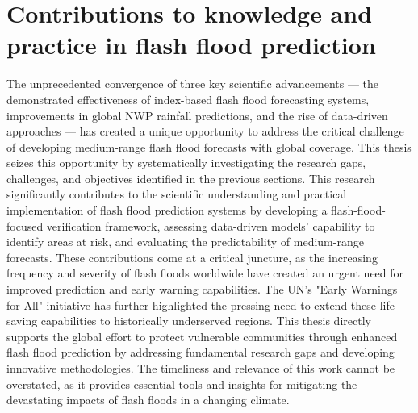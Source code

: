 \section{Contributions to knowledge and practice in flash flood prediction}


The unprecedented convergence of three key scientific advancements — the demonstrated effectiveness of index-based flash flood forecasting systems, improvements in global NWP rainfall predictions, and the rise of data-driven approaches — has created a unique opportunity to address the critical challenge of developing medium-range flash flood forecasts with global coverage. This thesis seizes this opportunity by systematically investigating the research gaps, challenges, and objectives identified in the previous sections. This research significantly contributes to the scientific understanding and practical implementation of flash flood prediction systems by developing a flash-flood-focused verification framework, assessing data-driven models' capability to identify areas at risk, and evaluating the predictability of medium-range forecasts. These contributions come at a critical juncture, as the increasing frequency and severity of flash floods worldwide have created an urgent need for improved prediction and early warning capabilities. The UN's "Early Warnings for All" initiative has further highlighted the pressing need to extend these life-saving capabilities to historically underserved regions. This thesis directly supports the global effort to protect vulnerable communities through enhanced flash flood prediction by addressing fundamental research gaps and developing innovative methodologies. The timeliness and relevance of this work cannot be overstated, as it provides essential tools and insights for mitigating the devastating impacts of flash floods in a changing climate.

